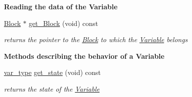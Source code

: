 \begin{Indent}\textbf{ Reading the data of the Variable}\par
\begin{DoxyCompactItemize}
\item 
\mbox{\label{class_s_m_spp__di__unipi__it_1_1_variable_abb90eec380b99ebb3d015f6d5f9e26b8}} 
\mbox{\hyperlink{class_s_m_spp__di__unipi__it_1_1_block}{Block}} $\ast$ \mbox{\hyperlink{class_s_m_spp__di__unipi__it_1_1_variable_abb90eec380b99ebb3d015f6d5f9e26b8}{get\+\_\+\+Block}} (void) const
\begin{DoxyCompactList}\small\item\em returns the pointer to the \mbox{\hyperlink{class_s_m_spp__di__unipi__it_1_1_block}{Block}} to which the \mbox{\hyperlink{class_s_m_spp__di__unipi__it_1_1_variable}{Variable}} belongs \end{DoxyCompactList}\end{DoxyCompactItemize}
\end{Indent}
\begin{Indent}\textbf{ Methods describing the behavior of a Variable}\par
\begin{DoxyCompactItemize}
\item 
\mbox{\hyperlink{class_s_m_spp__di__unipi__it_1_1_variable_a32378add5594ab0f1fb45e711d88924d}{var\+\_\+type}} \mbox{\hyperlink{class_s_m_spp__di__unipi__it_1_1_variable_abdc6f84bc8ff679bb6fcababcfb1ace5}{get\+\_\+state}} (void) const
\begin{DoxyCompactList}\small\item\em returns the state of the \mbox{\hyperlink{class_s_m_spp__di__unipi__it_1_1_variable}{Variable}} \end{DoxyCompactList}\end{DoxyCompactItemize}
\end{Indent}
\textbf{ }\par
